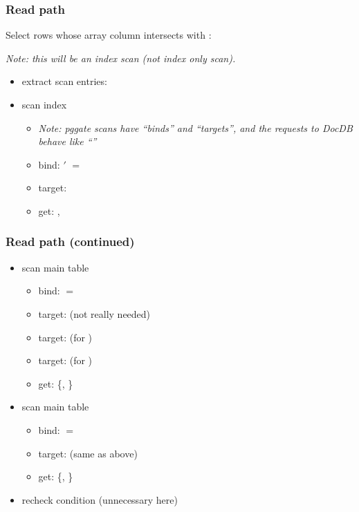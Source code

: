 \begin{frame}
  \frametitle{Read path}
  Select rows whose array column intersects with :

  \pause

  \emph{Note: this will be an index scan (not index only scan).}
  \pause

  \begin{itemize}
    \item extract scan entries: 
      \pause
    \item scan index
      \begin{itemize}
        \item \emph{Note: pggate scans have ``binds'' and ``targets'', and the
          requests to DocDB behave like ``''}
          \pause
        \item bind: $'$ $=$ 
          \pause
        \item target: 
          \pause
        \item get: , 
      \end{itemize}
  \end{itemize}
\end{frame}

\begin{frame}
  \frametitle{Read path (continued)}
  \begin{itemize}
    \item scan main table
      \begin{itemize}
        \item bind:  $=$ 
          \pause
        \item target:  (not really needed)
        \item target:  (for )
        \item target:  (for )
          \pause
        \item get: \{, \}
      \end{itemize}
      \pause
    \item scan main table
      \begin{itemize}
        \item bind:  $=$ 
          \pause
        \item target: (same as above)
          \pause
        \item get: \{, \}
      \end{itemize}
      \pause
    \item recheck condition (unnecessary here)
  \end{itemize}
\end{frame}


